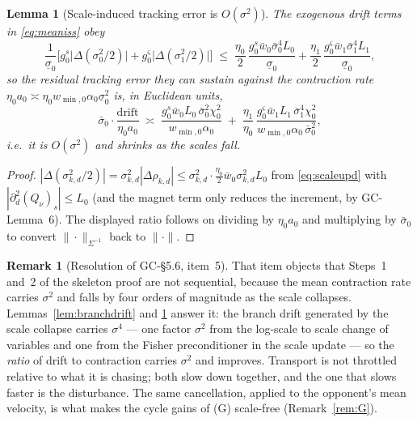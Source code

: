 \documentclass[11pt]{article}
\newtheorem{lemma}{Lemma}
\theoremstyle{definition}
\newtheorem{remark}{Remark}
\newcommand{\GC}[1]{\textsf{GC-#1}}
\begin{document}
\begin{lemma}[Scale-induced tracking error is $O(\sigma^2)$]\label{lem:scalefree}
The exogenous drift terms in \eqref{eq:meaniss} obey
\[
  \frac{1}{\underline\sigma_0}\Big[
        g^s_0\big|\Delta(\sigma_0^2/2)\big|
      + g^\varsigma_0\big|\Delta(\sigma_1^2/2)\big|\Big]
  \;\le\; \frac{\eta_0}{2}\, \frac{g^s_0 \bar w_0 \bar\sigma_0^4 L_0}
                                   {\underline\sigma_0}
        + \frac{\eta_1}{2}\, \frac{g^\varsigma_0 \bar w_1 \bar\sigma_1^4 L_1}
                                   {\underline\sigma_0} ,
\]
so the residual tracking error they can sustain against the contraction rate
$\eta_0 a_0 \asymp \eta_0 w_{\min,0}\alpha_0\underline\sigma_0^2$ is, in Euclidean
units,
\[
  \bar\sigma_0 \cdot \frac{\text{drift}}{\eta_0 a_0}
  \;\asymp\; \frac{g^s_0 \bar w_0 L_0\, \bar\sigma_0^2 \chi_0^2}
                  {w_{\min,0}\alpha_0}
   \;+\; \frac{\eta_1}{\eta_0}\,
         \frac{g^\varsigma_0 \bar w_1 L_1\, \bar\sigma_1^4 \chi_0^2}
              {w_{\min,0}\alpha_0\,\bar\sigma_0^2} ,
\]
i.e.\ it is $O(\sigma^2)$ and \emph{shrinks} as the scales fall.
\end{lemma}

\begin{proof}
$|\Delta(\sigma_{k,d}^2/2)| = \sigma_{k,d}^2 |\Delta\rho_{k,d}| \le
\sigma_{k,d}^2 \cdot \tfrac{\eta_0}{2} \bar w_0 \sigma_{k,d}^2 L_0$ from
\eqref{eq:scaleupd} with $|\partial_d^2 (Q_\nu)_s| \le L_0$ (and the magnet term
only reduces the increment, by \GC{Lemma~6}). The displayed ratio follows on
dividing by $\eta_0 a_0$ and multiplying by $\bar\sigma_0$ to convert
$\|\cdot\|_{\Sigma^{-1}}$ back to $\|\cdot\|$.
\end{proof}

\begin{remark}[Resolution of \GC{\S5.6}, item~5]\label{rem:gap5}
That item objects that Steps~1 and~2 of the skeleton proof are not sequential,
because the mean contraction rate carries $\sigma^2$ and falls by four orders of
magnitude as the scale collapses. Lemmas~\ref{lem:branchdrift} and
\ref{lem:scalefree} answer it: the branch drift generated by the scale collapse
carries $\sigma^4$ --- one factor $\sigma^2$ from the log-scale to scale change of
variables and one from the Fisher preconditioner in the scale update --- so the
\emph{ratio} of drift to contraction carries $\sigma^2$ and improves. Transport is
not throttled relative to what it is chasing; both slow down together, and the
one that slows faster is the disturbance. The same cancellation, applied to the
opponent's mean velocity, is what makes the cycle gains of (G) scale-free
(Remark~\ref{rem:G}).
\end{remark}
\end{document}
